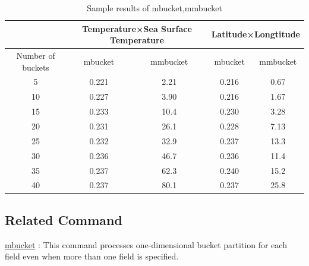 \begin{table}[hbt]
\begin{center}
\caption{Sample results of mbucket,mmbucket \label{tbl:mmbucket_table2}}
{\footnotesize
\begin{tabular}{c|c|c|c|c}
\hline
& \multicolumn{2}{|c|}{Temperature×Sea Surface Temperature} & \multicolumn{2}{|c}{Latitude×Longtitude} \\ \hline
Number of buckets &mbucket &mmbucket &mbucket &mmbucket\\ \hline
5 &0.221 &2.21 &0.216 &0.67\\
10 &0.227 &3.90 &0.216 &1.67\\
15 &0.233 &10.4 &0.230 &3.28\\
20 &0.231 &26.1 &0.228 &7.13\\
25 &0.232 &32.9 &0.237 &13.3\\
30 &0.236 &46.7 &0.236 &11.4\\
35 &0.237 &62.3 &0.240 &15.2\\
40 &0.237 &80.1 &0.237 &25.8\\ \hline
\end{tabular}
}
\end{center}
\end{table}

\subsection*{Related Command}
\hyperref[sect:mbucket]{mbucket} : This command processes one-dimensional bucket partition for each field even when more than one field is specified.

%


